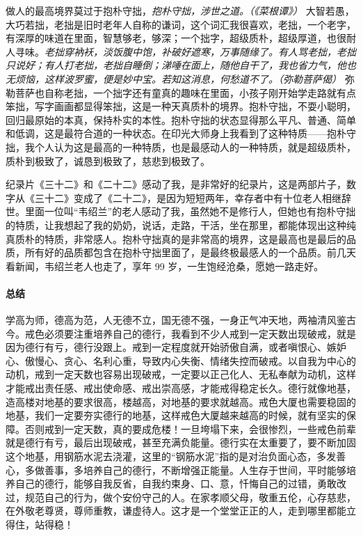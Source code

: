 做人的最高境界莫过于抱朴守拙，\textit{抱朴守拙，涉世之道。（《菜根谭》）} 大智若愚，大巧若拙，老拙是旧时老年人自称的谦词，这个词汇我很喜欢，老拙，一个老字，有深厚的味道在里面，智慧够老，够深；一个拙字，超级质朴，超级厚道，也很耐人寻味。\textit{老拙穿衲袄，淡饭腹中饱，补破好遮寒，万事随缘了。有人骂老拙，老拙只说好；有人打老拙，老拙自睡倒；涕唾在面上，随他自干了，我也省力气，他也无烦恼，这样波罗蜜，便是妙中宝。若知这消息，何愁道不了。（弥勒菩萨偈）} 弥勒菩萨也自称老拙，一个拙字还有童真的趣味在里面，小孩子刚开始学走路就有点笨拙，写字画画都显得笨拙，这是一种天真质朴的境界。抱朴守拙，不耍小聪明，回归最原始的本真，保持朴实的本性。抱朴守拙的状态显得那么平凡、普通、简单和低调，这是最符合道的一种状态。在印光大师身上我看到了这种特质——抱朴守拙，我个人认为这是最高的一种特质，也是最感动人的一种特质，就是超级质朴，质朴到极致了，诚恳到极致了，慈悲到极致了。

纪录片《三十二》和《二十二》感动了我，是非常好的纪录片，这是两部片子，数字从《三十二》变成了《二十二》，是因为短短两年，幸存者中有十位老人相继辞世。里面一位叫“韦绍兰”的老人感动了我，虽然她不是修行人，但她也有抱朴守拙的特质，让我想起了我的奶奶，说话，走路，干活，坐在那里，都能体现出这种纯真质朴的特质，非常感人。抱朴守拙真的是非常高的境界，这是最高也是最后的品质，所有好的品质都包含在抱朴守拙里面了，是最终极最感人的一个品质。前几天看新闻，韦绍兰老人也走了，享年 99 岁，一生饱经沧桑，愿她一路走好。

\paragraph*{总结}

学高为师，德高为范，人无德不立，国无德不强，一身正气冲天地，两袖清风鉴古今。戒色必须要注重培养自己的德行，我看到不少人戒到一定天数出现破戒，就是因为德行有亏，德行没跟上。戒到一定程度就开始骄傲自满，或者嗔恨心、嫉妒心、傲慢心、贪心、名利心重，导致内心失衡、情绪失控而破戒。以自我为中心的动机，戒到一定天数也容易出现破戒，一定要以正己化人、无私奉献为动机，这样才能戒出责任感、戒出使命感、戒出崇高感，才能戒得稳定长久。德行就像地基，造高楼对地基的要求很高，楼越高，对地基的要求就越高。戒色大厦也需要稳固的地基，我们一定要夯实德行的地基，这样戒色大厦越来越高的时候，就有坚实的保障。否则戒到一定天数，真的要成危楼！一旦垮塌下来，会很惨烈，一些戒色前辈就是德行有亏，最后出现破戒，甚至充满负能量。德行实在太重要了，要不断加固这个地基，用钢筋水泥去浇灌，这里的“钢筋水泥”指的是对治负面心态，多发善心，多做善事，多培养自己的德行，不断增强正能量。人生存于世间，平时能够培养自己的德行，能够自我反省，自我约束身、口、意，忏悔自己的过错，勇敢改过，规范自己的行为，做个安份守己的人。在家孝顺父母，敬重五伦，心存慈悲，在外敬老尊贤，尊师重教，谦虚待人。这才是一个堂堂正正的人，走到哪里都能立得住，站得稳！

